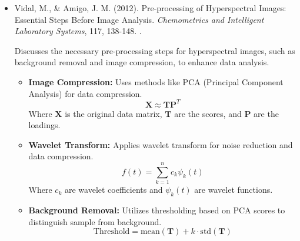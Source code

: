 \documentclass[10pt,svgnames,fragile]{beamer}
\begin{document}
\begin{frame}{}
\tiny
\begin{itemize}

    \item Vidal, M., \& Amigo, J. M. (2012). Pre-processing of Hyperspectral Images: Essential Steps Before Image Analysis. \textit{Chemometrics and Intelligent Laboratory Systems}, 117, 138-148. \href{https://doi.org/10.1016/j.chemolab.2012.05.009}{\color{blue}{DOI: 10.1016/j.chemolab.2012.05.009}}. \cite{vidalPreprocessingHyperspectralImages2012}
    
    {\color{gray}Discusses the necessary pre-processing steps for hyperspectral images, such as background removal and image compression, to enhance data analysis.}
    \begin{itemize} \tiny
    \item \textbf{Image Compression:} Uses methods like PCA (Principal Component Analysis) for data compression.
    \[
    \mathbf{X} \approx \mathbf{T} \mathbf{P}^T
    \]
    Where \( \mathbf{X} \) is the original data matrix, \( \mathbf{T} \) are the scores, and \( \mathbf{P} \) are the loadings.
    \item \textbf{Wavelet Transform:} Applies wavelet transform for noise reduction and data compression.
    \[
    f(t) = \sum_{k=1}^{n} c_k \psi_k(t)
    \]
    Where \( c_k \) are wavelet coefficients and \( \psi_k(t) \) are wavelet functions.
    \item \textbf{Background Removal:} Utilizes thresholding based on PCA scores to distinguish sample from background.
    \[
    \text{Threshold} = \text{mean}(\mathbf{T}) + k \cdot \text{std}(\mathbf{T})
    \]
\end{itemize}
    
\end{itemize}
\end{frame}
\end{document}

